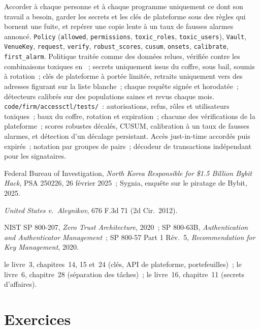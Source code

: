 \begin{build}
 Accorder à chaque personne et à chaque programme uniquement ce dont son travail a besoin, garder les secrets et les clés de plateforme sous des règles qui bornent une fuite, et repérer une
copie lente à un taux de fausses alarmes annoncé.
 \texttt{Policy} (\texttt{allowed}, \texttt{permissions}, \texttt{toxic\_roles}, \texttt{toxic\_users}), \texttt{Vault},
\texttt{VenueKey}, \texttt{request}, \texttt{verify}, \texttt{robust\_scores}, \texttt{cusum}, \texttt{onsets}, \texttt{calibrate},
\texttt{first\_alarm}.
 Politique traitée comme des données relues, vérifiée contre les combinaisons toxiques en ~; secrets uniquement issus du coffre, sous bail,
soumis à rotation~; clés de plateforme à portée limitée, retraits uniquement vers des adresses figurant sur la liste blanche~; chaque requête signée et horodatée~; détecteurs calibrés sur des
populations saines et revus chaque mois.
 \texttt{code/firm/accessctl/tests/}~: autorisations, refus, rôles et utilisateurs toxiques~; baux du coffre, rotation et expiration~; chacune des vérifications
de la plateforme~; scores robustes décalés, CUSUM, calibration à un taux de fausses alarmes, et détection d'un décalage persistant.
 Accès just-in-time accordés puis expirés~; notation par groupes de pairs~; décodeur de transactions indépendant pour les signataires.
\end{build}

\begin{omsources}
\item Federal Bureau of Investigation, \emph{North Korea Responsible for \$1.5 Billion Bybit Hack}, PSA 250226, 26 février 2025~; Sygnia,
enquête sur le piratage de Bybit, 2025.
\item \emph{United States v.\ Aleynikov}, 676 F.3d 71 (2d Cir.\ 2012).
\item NIST SP 800-207, \emph{Zero Trust Architecture}, 2020~; SP 800-63B, \emph{Authentication and Authenticator Management}~; SP 800-57 Part 1
Rév.~5, \emph{Recommendation for Key Management}, 2020.
\item le livre~3, chapitres~14, 15 et~24 (clés, API de plateforme, portefeuilles)~; le livre~6, chapitre~28 (séparation des tâches)~; le livre~16, chapitre~11
(secrets d'affaires).
\end{omsources}

\section{Exercices}

